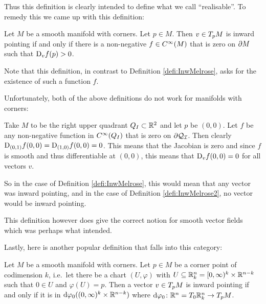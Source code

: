 Thus this definition is clearly intended to define what we call ``realisable''. 
To remedy this we came up with this definition: 

\begin{defi}\label{defi:InwMelrose2}
    Let $M$ be a smooth manifold with corners. Let $p \in M$. Then $v \in T_{p}M$ is inward pointing if and only if there is a non-negative $f \in C^\infty(M)$ that is zero on $\partial{M}$ such that $\text{D}_{v}f (p) > 0$. 
\end{defi}

Note that this definition, in contrast to Definition \ref{defi:InwMelrose}, asks for the existence of such a function $f$.

Unfortunately, both of the above definitions do not work for manifolds with corners: 

\begin{example}
    Take $M$ to be the right upper quadrant $Q_I \subset \mathbb{R}^2$ and let $p$ be $(0, 0)$. 
    Let $f$ be any non-negative function in $C^\infty(Q_I)$ that is zero on $\partial{\mathcal{Q_I}}$. 
    Then clearly $\text{D}_{(0, 1)}f (0, 0) =\text{D}_{(1, 0)}f (0, 0) = 0$. 
    This means that the Jacobian is zero and since $f$ is smooth and thus differentiable at $(0, 0)$, this means that $\text{D}_{v}f (0, 0) = 0$ for all vectors $v$. 

    So in the case of Definition \ref{defi:InwMelrose}, this would mean that any vector was inward pointing, and in the case of Definition \ref{defi:InwMelrose2}, no vector would be inward pointing. 
\end{example}

This definition however does give the correct notion for smooth vector fields which was perhaps what \citeauthor{Melrose1996} intended. 

Lastly, here is another popular definition that falls into this category: 

\begin{defi}
    Let $M$ be a smooth manifold with corners. 
    Let $p \in M$ be a corner point of codimension $k$, i.e.\ let there be a chart $(U, \varphi)$ with $U \subseteq \mathbb{R}^n_k = [0, \infty)^k \times \mathbb{R}^{n - k}$ such that $0 \in U$ and $\varphi(U) = p$. 
    Then a vector $v \in T_{p}M$ is inward pointing if and only if it is in $\text{d}{\varphi}_{0} ((0, \infty)^k \times \mathbb{R}^{n - k})$ where $\text{d}{\varphi}_{0} \colon \mathbb{R}^n = T_{0}\mathbb{R}^n_k \to T_{p}M$.
\end{defi}

